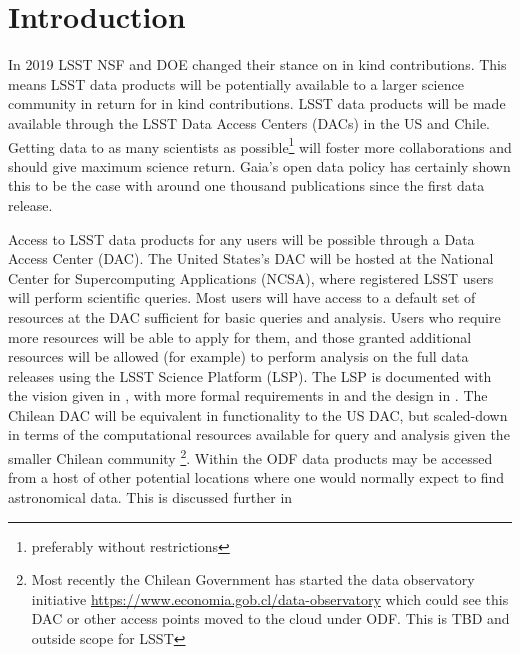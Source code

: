 \section{Introduction}\label{sec:intro}

In 2019 LSST NSF and DOE  changed their stance on in kind contributions. This means LSST data products will be potentially  available to  a larger  science community in return for in kind contributions. LSST data products will be made available through the LSST Data Access Centers (DACs) in the US and Chile.
Getting data to as many scientists as possible\footnote{preferably without restrictions} will foster more collaborations and should give maximum science return. Gaia's \citep{2016A&A...595A...1G} open data policy has certainly shown this to be the case with around one thousand publications since the first data release. %


Access to LSST data products for any users will be possible through a Data Access Center (DAC). The United States's DAC will be hosted at the National Center for Supercomputing Applications (NCSA),
where registered LSST users will perform scientific queries. Most users will have access to a default set of resources at the DAC sufficient for basic queries and analysis. Users who require more resources will be able to apply for them, and those granted additional resources will be allowed (for example) to perform analysis on the full data releases using the LSST Science Platform (LSP). The LSP is documented with the vision given in , with more formal requirements in  and the design in . The Chilean DAC will be equivalent in functionality to the US DAC, but scaled-down in terms of the computational resources available for query and analysis given the smaller Chilean community \footnote{Most recently the Chilean Government has started the data observatory initiative \url{https://www.economia.gob.cl/data-observatory} which could see this DAC or other access points moved to the cloud under ODF. This is TBD and outside scope for LSST}.
Within the ODF data products may be accessed from a host of other potential locations where one would normally expect to find astronomical data. This is discussed further in 

